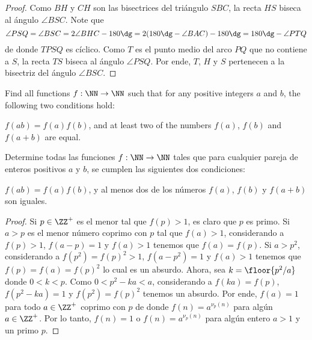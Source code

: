\begin{proof}
	Como $BH$ y $CH$ son las bisectrices del triángulo $SBC$, la recta $HS$ biseca al ángulo $\angle BSC$. Note que
	\[\angle PSQ=\angle BSC=2\angle BHC-180\dg=2(180\dg-\angle BAC)-180\dg=180\dg-\angle PTQ\]
	de donde $TPSQ$ es cíclico. Como $T$ es el punto medio del arco $PQ$ que no contiene a $S$, la recta $TS$ biseca al ángulo $\angle PSQ$. Por ende, $T$, $H$ y $S$ pertenecen a la bisectriz del ángulo $\angle BSC$.
\end{proof}

\begin{probMG}[EGMO 2022/2]
	Find all functions $f:\NN\to\NN$ such that for any positive integers $a$ and $b$, the following two conditions hold:
	\begin{enumerate}[(1)]
		\ii $f(ab)=f(a)f(b)$, and
		\ii at least two of the numbers $f(a)$, $f(b)$ and $f(a+b)$ are equal.
	\end{enumerate}
	\begin{probSP}
		Determine todas las funciones $f:\NN\to\NN$ tales que para cualquier pareja de enteros positivos $a$ y $b$, se cumplen las siguientes dos condiciones:
		\begin{enumerate}[(1)]
			\ii $f(ab)=f(a)f(b)$, y
			\ii al menos dos de los números $f(a)$, $f(b)$ y $f(a+b)$ son iguales.
		\end{enumerate}
	\end{probSP}
\end{probMG}

\begin{proof}
	Si $p\in\ZZ^+$ es el menor tal que $f(p)>1$, es claro que $p$ es primo. Si $a>p$ es el menor número coprimo con $p$ tal que $f(a)>1$, considerando a $f(p)>1$, $f(a-p)=1$ y $f(a)>1$ tenemos que $f(a)=f(p)$. Si $a>p^2$, considerando a $f(p^2)=f(p)^2>1$, $f(a-p^2)=1$ y $f(a)>1$ tenemos que $f(p)=f(a)=f(p)^2$ lo cual es un absurdo. Ahora, sea $k=\floor{p^2/a}$ donde $0<k<p$. Como $0<p^2-ka<a$, considerando a $f(ka)=f(p)$, $f(p^2-ka)=1$ y $f(p^2)=f(p)^2$ tenemos un absurdo. Por ende, $f(a)=1$ para todo $a\in\ZZ^+$ coprimo con $p$ de donde $f(n)=a^{\nu_p(n)}$ para algún $a\in\ZZ^+$. Por lo tanto, $f(n)=1$ o $f(n)=a^{\nu_p(n)}$ para algún entero $a>1$ y un primo $p$.
\end{proof}

